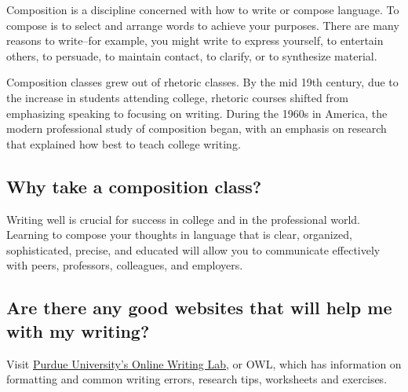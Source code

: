 Composition is a discipline concerned with how to write or compose language. To 
compose is to select and arrange words to achieve your purposes. There are many 
reasons to write--for example, you might write to express yourself, to entertain others, 
to persuade, to maintain contact, to clarify, or to synthesize material.

Composition classes grew out of rhetoric classes. By the mid 19th century, due to the 
increase in students attending college, rhetoric courses shifted from emphasizing 
speaking to focusing on writing. During the 1960s in America, the modern professional 
study of composition began, with an emphasis on research that explained how best to 
teach college writing.
 
\subsection{Why take a composition class?}

Writing well is crucial for success in college and in the professional world. Learning to 
compose your thoughts in language that is clear, organized, sophisticated, precise, and 
educated will allow you to communicate effectively with peers, professors, colleagues, 
and employers.


\subsection{Are there any good websites that will help me with my writing?}
Visit \href{http://owl.english.purdue.edu}{Purdue University's Online Writing Lab}, or 
OWL, which has information on formatting and common writing errors, research tips, 
worksheets and exercises.


